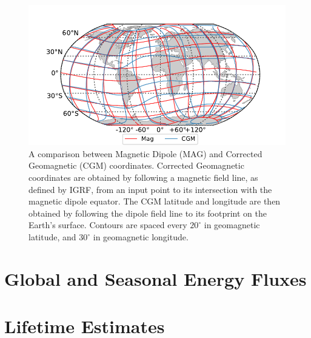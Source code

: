 \begin{figure}[ht]
\begin{center}
\includegraphics{figures/CGM_globe_comparison.pdf}
\caption[Comparison of Magnetic Dipole (MAG) and Corrected Geomagnetic (CGM) coordinates]{A comparison between Magnetic Dipole (MAG) and Corrected Geomagnetic (CGM) coordinates. Corrected Geomagnetic coordinates are obtained by following a magnetic field line, as defined by IGRF, from an input point to its intersection with the magnetic dipole equator. The CGM latitude and longitude are then obtained by following the dipole field line to its footprint on the Earth's surface. Contours are spaced every $20^\circ$ in geomagnetic latitude, and $30^\circ$ in geomagnetic longitude.}
\label{fig:CGM_globe_comparison}
\end{center}
\end{figure}

\section{Global and Seasonal Energy Fluxes}

\section{Lifetime Estimates}